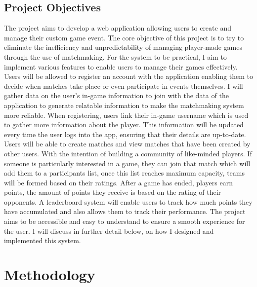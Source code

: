 \section{Project Objectives}
The project aims to develop a web application allowing users to create and manage their custom game event. The core objective of this project is to try to eliminate the inefficiency and unpredictability of managing player-made games through the use of matchmaking. For the system to be practical, I aim to implement various features to enable users to manage their games effectively.
Users will be allowed to register an account with the application enabling them to decide when matches take place or even participate in events themselves. \hfill \break
I will gather data on the user's in-game information to join with the data of the application to generate relatable information to make the matchmaking system more reliable. When registering, users link their in-game username which is used to gather more information about the player. This information will be updated every time the user logs into the app, ensuring that their details are up-to-date.
Users will be able to create matches and view matches that have been created by other users. With the intention of building a community of like-minded players. \hfill \break
If someone is particularly interested in a game, they can join that match which will add them to a participants list, once this list reaches maximum capacity, teams will be formed based on their ratings. \hfill \break
After a game has ended, players earn points, the amount of points they receive is based on the rating of their opponents. A leaderboard system will enable users to track how much points they have accumulated and also allows them to track their performance. \hfill \break
The project aims to be accessible and easy to understand to ensure a smooth experience for the user. I will discuss in further detail below, on how I designed and implemented this system.



\chapter{Methodology}
